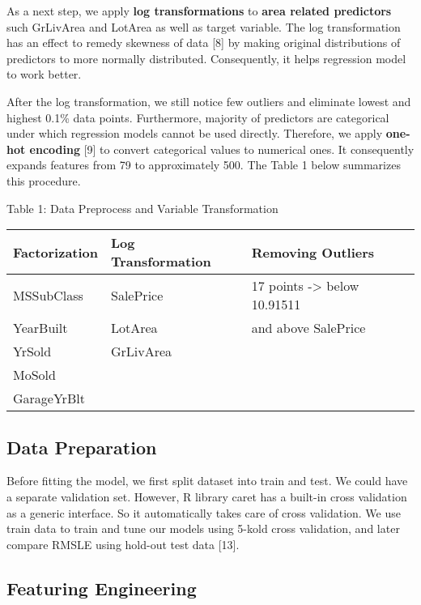 \documentclass[a4paper]{article}
\begin{document}
\begin{flushleft}
As a next step, we apply \textbf{log transformations} to \textbf{area related predictors} such GrLivArea and LotArea as well as target variable. The log transformation has an effect to remedy skewness of data [8] by making original distributions of predictors to more normally distributed. Consequently, it helps regression model to work better. \newline

After the log transformation, we still notice few outliers and eliminate lowest and highest 0.1\% data points. Furthermore, majority of predictors are categorical under which regression models cannot be used directly. Therefore, we apply \textbf{one-hot encoding} [9] to convert categorical values to numerical ones. It consequently expands features from 79 to approximately 500. The Table 1 below summarizes this procedure. \newline

Table 1: Data Preprocess and Variable Transformation

\vspace{2mm}
\begin{center}
\begin{tabular}{ | p{4.5cm} | p{4.5cm} | p{4.5cm} |}
  \hline			
  Factorization & Log Transformation & Removing Outliers\\
  \hline  
  MSSubClass & SalePrice & 17 points -> below 10.91511 \\
  YearBuilt & LotArea & and above SalePrice \\
  YrSold & GrLivArea & \\ 
  MoSold & & \\
  GarageYrBlt & & \\
  \hline  
\end{tabular}
\end{center}

\subsection{Data Preparation}
Before fitting the model, we first split dataset into train and test. We could have a separate validation set. However,  R library caret has a built-in cross validation as a generic interface. So it automatically takes care of cross validation. We use train data to train and tune our models using 5-kold cross validation, and later compare RMSLE using hold-out test data [13]. \newline

\subsection{Featuring Engineering}


\end{flushleft}
\end{document}
